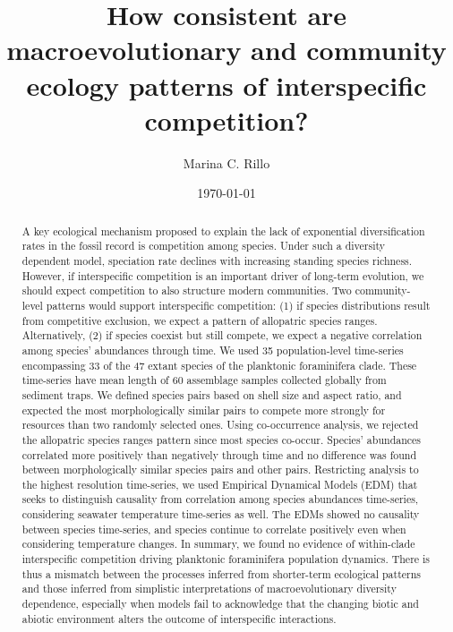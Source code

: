 \documentclass[a4paper]{article}
\title{How consistent are macroevolutionary and community ecology patterns of interspecific competition?}
\author{Marina C. Rillo} %
\date{\today}
\begin{document}
\maketitle

\begin{abstract}

A key ecological mechanism proposed to explain the lack of exponential diversification rates in the fossil record is competition among species. Under such a diversity dependent model, speciation rate declines with increasing standing species richness. However, if interspecific competition is an important driver of long-term evolution, we should expect competition to also structure modern communities. Two community-level patterns would support interspecific competition: (1) if species distributions result from competitive exclusion, we expect a pattern of allopatric species ranges. Alternatively, (2) if species coexist but still compete, we expect a negative correlation among species’ abundances through time. We used 35 population-level time-series encompassing 33 of the 47 extant species of the planktonic foraminifera clade. These time-series have mean length of 60 assemblage samples collected globally from sediment traps. We defined species pairs based on shell size and aspect ratio, and expected the most morphologically similar pairs to compete more strongly for resources than two randomly selected ones. Using co-occurrence analysis, we rejected the allopatric species ranges pattern since most species co-occur. Species’ abundances correlated more positively than negatively through time and no difference was found between morphologically similar species pairs and other pairs. Restricting analysis to the highest resolution time-series, we used Empirical Dynamical Models (EDM) that seeks to distinguish causality from correlation among species abundances time-series, considering seawater temperature time-series as well. The EDMs showed no causality between species time-series, and species continue to correlate positively even when considering temperature changes. In summary, we found no evidence of within-clade interspecific competition driving planktonic foraminifera population dynamics.  There is thus a mismatch between the processes inferred from shorter-term ecological patterns and those inferred from simplistic interpretations of macroevolutionary diversity dependence, especially when models fail to acknowledge that the changing biotic and abiotic environment alters the outcome of interspecific interactions.

\end{abstract}
\end{document}
